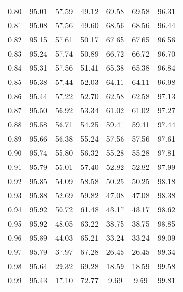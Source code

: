 \begin{tabular}{|c|c|c|c|c|c|c|}
      0.80 &     95.01 &     57.59 &      49.12 &   69.58 &      69.58 &         96.31 \\
      0.81 &     95.08 &     57.56 &      49.60 &   68.56 &      68.56 &         96.44 \\
      0.82 &     95.15 &     57.61 &      50.17 &   67.65 &      67.65 &         96.56 \\
      0.83 &     95.24 &     57.74 &      50.89 &   66.72 &      66.72 &         96.70 \\
      0.84 &     95.31 &     57.56 &      51.41 &   65.38 &      65.38 &         96.84 \\
      0.85 &     95.38 &     57.44 &      52.03 &   64.11 &      64.11 &         96.98 \\
      0.86 &     95.44 &     57.22 &      52.70 &   62.58 &      62.58 &         97.13 \\
      0.87 &     95.50 &     56.92 &      53.34 &   61.02 &      61.02 &         97.27 \\
      0.88 &     95.58 &     56.71 &      54.25 &   59.41 &      59.41 &         97.44 \\
      0.89 &     95.66 &     56.38 &      55.24 &   57.56 &      57.56 &         97.61 \\
      0.90 &     95.74 &     55.80 &      56.32 &   55.28 &      55.28 &         97.81 \\
      0.91 &     95.79 &     55.01 &      57.40 &   52.82 &      52.82 &         97.99 \\
      0.92 &     95.85 &     54.09 &      58.58 &   50.25 &      50.25 &         98.18 \\
      0.93 &     95.88 &     52.69 &      59.82 &   47.08 &      47.08 &         98.38 \\
      0.94 &     95.92 &     50.72 &      61.48 &   43.17 &      43.17 &         98.62 \\
      0.95 &     95.92 &     48.05 &      63.22 &   38.75 &      38.75 &         98.85 \\
      0.96 &     95.89 &     44.03 &      65.21 &   33.24 &      33.24 &         99.09 \\
      0.97 &     95.79 &     37.97 &      67.28 &   26.45 &      26.45 &         99.34 \\
      0.98 &     95.64 &     29.32 &      69.28 &   18.59 &      18.59 &         99.58 \\
      0.99 &     95.43 &     17.10 &      72.77 &    9.69 &       9.69 &         99.81 \\
\bottomrule
\end{tabular}
